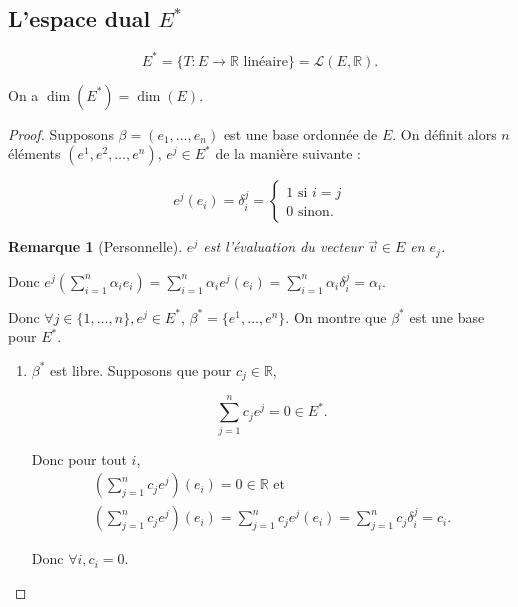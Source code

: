 \documentclass[french]{article}
\newtheorem*{remark}{Remarque}
\begin{document}
\subsection{L'espace dual $E ^{*}$}

\[
E ^{*} = \{ T : E \to \mathbb{R} \text{ linéaire}  \} = \mathscr{L}(E, \mathbb{R}) .
\]


\begin{thm}
  On a $\operatorname{dim}(E ^{*}) = \operatorname{dim}(E)$.
\end{thm}

\begin{proof}
  Supposons $\beta = (e_1, \dots, e_n) $ est une base ordonnée de $E$. On définit alors $n$ éléments $(e ^{1}, e ^2, \dots, e ^{n})$, $e ^{j} \in E ^{*}$ de la manière suivante :

  \[
  e ^{j}(e_i) = \delta _{i} ^{j} = \begin{cases}
    1 \text{ si } i=j \\
    0 \text{ sinon. }
  \end{cases}
  \]

  \begin{remark}[Personnelle]
    $e ^{j}$ est l'évaluation du vecteur $\overrightarrow{ v } \in E$ en $e_j$.
  \end{remark}

  Donc $\displaystyle e ^j \left(\sum_{i=1}^{n} \alpha_i e_i \right) = \sum_{i=1}^{n} \alpha_i e ^{j}(e_i) = \sum_{i=1}^{n} \alpha_i \delta _{i} ^{j} = \alpha_i   $.

  Donc $\forall j \in \{ 1, \dots, n \}, e ^{j} \in E ^{*} $, $\beta ^{*} = \{ e ^{1}, \dots, e ^{n} \} $. On montre que $\beta ^{*}$ est une base pour $E ^{*}$.

  \begin{enumerate}
    \item $\beta ^{*}$ est libre. Supposons que pour $c_j \in \mathbb{R}$,

    \[
    \sum_{j=1}^{n} c_j e ^{j} = 0 \in E ^{*}.
    \]



    Donc pour tout $i$,
    \begin{gather*}
      \left(\sum_{j=1}^{n} c_j e ^{j} \right) (e_i) = 0 \in \mathbb{R} \text{ et } \\
      \left(\sum_{j=1}^{n} c_j e ^{j} \right) (e_i) = \sum_{j=1}^{n}c_j e ^{j}(e_i) = \sum_{j=1}^{n}c_j \delta_i ^{j} = c_i.
    \end{gather*}

    Donc $\forall i, c_i = 0$.


\end{enumerate}
\end{proof}
\end{document}
